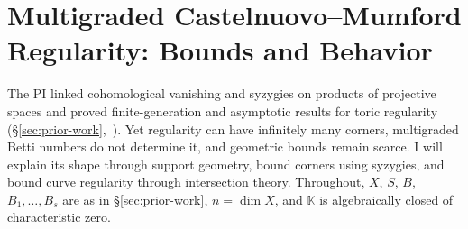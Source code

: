\documentclass[11pt,reqno]{amsart}
\newtheorem{conjecture}[lemma]{Conjecture}
\theoremstyle{remark}
\newcommand{\cliff}{\operatorname{Cliff}}
\newcommand{\KK}{\mathbb{K}}
\newcommand{\cL}{\mathcal{L}}
\newcommand{\cT}{\mathcal{T}}
\newcommand{\cW}{\mathcal{W}}
\newcommand{\cX}{\mathcal{X}}
\begin{document}
%
%
%

\section{Multigraded Castelnuovo--Mumford Regularity: Bounds and Behavior}\label{sec:multigraded-regularity}

The PI linked cohomological vanishing and syzygies on products of projective spaces and proved finite-generation and asymptotic results for toric regularity (\S\ref{sec:prior-work},~\cite{bruceHellerSayrafi22,bruceHellerSayrafi26}). Yet regularity can have infinitely many corners, multigraded Betti numbers do not determine it, and geometric bounds remain scarce. I will explain its shape through support geometry, bound corners using syzygies, and bound curve regularity through intersection theory. Throughout, $X$, $S$, $B$, $B_1,\ldots,B_s$ are as in \S\ref{sec:prior-work}, $n=\dim X$, and $\KK$ is algebraically closed of characteristic zero.
 
\end{document}
